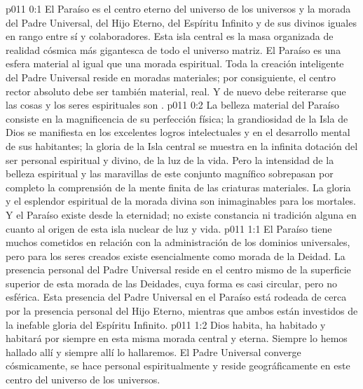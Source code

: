 \author{Perfeccionador de la sabiduría}
\vs p011 0:1 El Paraíso es el centro eterno del universo de los universos y la morada del Padre Universal, del Hijo Eterno, del Espíritu Infinito y de sus divinos iguales en rango entre sí y colaboradores. Esta isla central es la masa organizada de realidad cósmica más gigantesca de todo el universo matriz. El Paraíso es una esfera material al igual que una morada espiritual. Toda la creación inteligente del Padre Universal reside en moradas materiales; por consiguiente, el centro rector absoluto debe ser también material, real. Y de nuevo debe reiterarse que las cosas y los seres espirituales son .
\vs p011 0:2 La belleza material del Paraíso consiste en la magnificencia de su perfección física; la grandiosidad de la Isla de Dios se manifiesta en los excelentes logros intelectuales y en el desarrollo mental de sus habitantes; la gloria de la Isla central se muestra en la infinita dotación del ser personal espiritual y divino, de la luz de la vida. Pero la intensidad de la belleza espiritual y las maravillas de este conjunto magnífico sobrepasan por completo la comprensión de la mente finita de las criaturas materiales. La gloria y el esplendor espiritual de la morada divina son inimaginables para los mortales. Y el Paraíso existe desde la eternidad; no existe constancia ni tradición alguna en cuanto al origen de esta isla nuclear de luz y vida.
\vs p011 1:1 El Paraíso tiene muchos cometidos en relación con la administración de los dominios universales, pero para los seres creados existe esencialmente como morada de la Deidad. La presencia personal del Padre Universal reside en el centro mismo de la superficie superior de esta morada de las Deidades, cuya forma es casi circular, pero no esférica. Esta presencia del Padre Universal en el Paraíso está rodeada de cerca por la presencia personal del Hijo Eterno, mientras que ambos están investidos de la inefable gloria del Espíritu Infinito.
\vs p011 1:2 Dios habita, ha habitado y habitará por siempre en esta misma morada central y eterna. Siempre lo hemos hallado allí y siempre allí lo hallaremos. El Padre Universal converge cósmicamente, se hace personal espiritualmente y reside geográficamente en este centro del universo de los universos.

